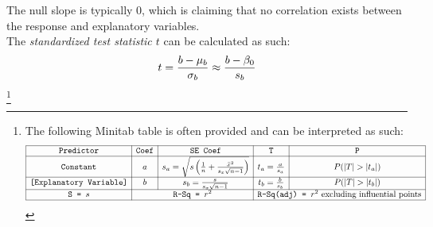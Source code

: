 \documentclass[../AP_Statistics.tex]{subfiles}
\begin{document}
		The null slope is typically 0, which is claiming that no correlation exists between the response and explanatory variables. \\
		The \emph{standardized test statistic $t$} can be calculated as such:
		\[t = \frac{b - \mu_b}{\sigma_b} \approx \frac{b - \beta_0}{s_b}\]
		\footnote{
				The following Minitab table is often provided and can be interpreted as such:
				\[\begin{array}{|c|c|c|c|c|}\hline
					\texttt{Predictor} & \texttt{Coef} & \texttt{SE Coef} & \texttt{T} & \texttt{P} \\\hline
					\texttt{Constant} & a & s_a = \sqrt{s\left(\frac{1}{n} + \frac{\bar{x}^2}{s_x\sqrt{n - 1}}\right)} & t_a = \frac{a}{s_a} & P(|T| > |t_a|) \\\hline
					\texttt{[Explanatory Variable]} & b & s_b = \frac{s}{s_x\sqrt{n - 1}} & t_b = \frac{b}{s_b} & P(|T| > |t_b|) \\\hline
					\texttt{S = } s & \multicolumn{2}{c|}{\texttt{R-Sq = } r^2} & \multicolumn{2}{c|}{\texttt{R-Sq(adj) = } r^2 \text{ excluding influential points}} \\\hline
				\end{array}\]}
\end{document}
